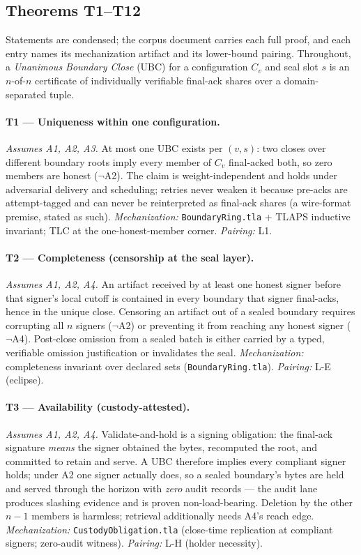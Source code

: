\documentclass[11pt]{article}
\newcommand{\code}[1]{\texttt{#1}}
\newcommand{\term}[1]{\textit{#1}}
\begin{document}
\subsection{Theorems T1--T12}
\label{sec:corpus-theorems}

Statements are condensed; the corpus document carries each full proof, and
each entry names its mechanization artifact and its lower-bound pairing.
Throughout, a \term{Unanimous Boundary Close} (UBC) for a configuration
\(C_v\) and seal slot \(s\) is an \(n\)-of-\(n\) certificate of
individually verifiable final-ack shares over a domain-separated tuple.

\paragraph{T1 --- Uniqueness within one configuration.}
\textit{Assumes A1, A2, A3.} At most one UBC exists per \((v, s)\): two
closes over different boundary roots imply every member of \(C_v\)
final-acked both, so zero members are honest (\(\lnot\)A2). The claim is
weight-independent and holds under adversarial delivery and scheduling;
retries never weaken it because pre-acks are attempt-tagged and can never
be reinterpreted as final-ack shares (a wire-format premise, stated as
such). \textit{Mechanization:} \code{BoundaryRing.tla} + TLAPS inductive
invariant; TLC at the one-honest-member corner. \textit{Pairing:} L1.

\paragraph{T2 --- Completeness (censorship at the seal layer).}
\textit{Assumes A1, A2, A4.} An artifact received by at least one honest
signer before that signer's local cutoff is contained in every boundary
that signer final-acks, hence in the unique close. Censoring an artifact
out of a sealed boundary requires corrupting all \(n\) signers
(\(\lnot\)A2) or preventing it from reaching any honest signer
(\(\lnot\)A4). Post-close omission from a sealed batch is either carried
by a typed, verifiable omission justification or invalidates the seal.
\textit{Mechanization:} completeness invariant over declared sets
(\code{BoundaryRing.tla}). \textit{Pairing:} L-E (eclipse).

\paragraph{T3 --- Availability (custody-attested).}
\textit{Assumes A1, A2, A4.} Validate-and-hold is a signing obligation: the
final-ack signature \emph{means} the signer obtained the bytes, recomputed
the root, and committed to retain and serve. A UBC therefore implies every
compliant signer holds; under A2 one signer actually does, so a sealed
boundary's bytes are held and served through the horizon with \emph{zero}
audit records --- the audit lane produces slashing evidence and is proven
non-load-bearing. Deletion by the other \(n-1\) members is harmless;
retrieval additionally needs A4's reach edge.
\textit{Mechanization:} \code{CustodyObligation.tla} (close-time
replication at compliant signers; zero-audit witness).
\textit{Pairing:} L-H (holder necessity).
\end{document}
